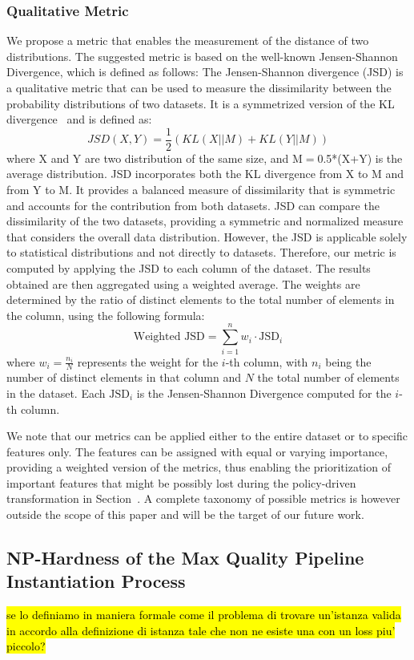 \subsubsection{Qualitative Metric}
We propose a metric that enables the measurement of the distance of two distributions. The suggested metric is based on the well-known Jensen-Shannon Divergence, which is defined as follows:
The Jensen-Shannon divergence (JSD) is a qualitative metric that can be used to measure the dissimilarity between the probability distributions of two datasets.
It is a symmetrized version of the KL divergence~\cite{Fuglede} and is defined as:
\[JSD(X, Y) = \frac{1}{2} \left( KL(X || M)
  + KL(Y || M) \right)\]
%
where X and Y are two distribution of the same size, and M$=$0.5*(X+Y) is the average distribution.
JSD incorporates both the KL divergence from X to M and from Y to M. It provides a balanced measure of dissimilarity that is symmetric and accounts for the contribution from both datasets.
%
JSD can compare the dissimilarity of the two datasets, providing a symmetric and normalized measure that considers the overall data distribution.
%
However, the JSD is applicable solely to statistical distributions and not directly to datasets. Therefore, our metric is computed by applying the JSD to each column of the dataset. The results obtained are then aggregated using a weighted average. The weights are determined by the ratio of distinct elements to the total number of elements in the column, using the following formula:
\[\text{Weighted JSD} = \sum_{i=1}^n w_i \cdot \text{JSD}_i\]
where \(w_i = \frac{n_i}{N}\) represents the weight for the \(i\)-th column, with \(n_i\) being the number of distinct elements in that column and \(N\) the total number of elements in the dataset. Each \(\text{JSD}_i\) is the Jensen-Shannon Divergence computed for the \(i\)-th column.

\vspace{0.5em}

We note that our metrics can be applied either to the entire dataset or to specific features only. The features can be assigned with equal or varying importance, providing a weighted version of the metrics, thus enabling the prioritization of important features that might be possibly lost during the policy-driven transformation in Section~\cite{ADD}. A complete taxonomy of possible metrics is however outside the scope of this paper and will be the target of our future work.

\subsection{NP-Hardness of the Max Quality Pipeline Instantiation Process}\label{sec:nphard}
\hl{se lo definiamo in maniera formale come il problema di trovare un'istanza valida in accordo alla definizione di istanza tale che non ne esiste una con un loss piu' piccolo?}

